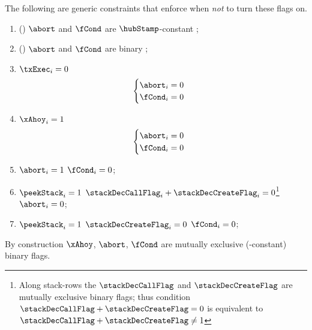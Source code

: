 The following are generic constraints that enforce when \emph{not} to turn these flags on.
\begin{enumerate}
	\item (\trash) $\abort$ and $\fCond$ are $\hubStamp$-constant ;
	\item (\trash) $\abort$ and $\fCond$ are binary ;
	\item \If $\txExec_{i} = 0$ \Then
		\[
			\begin{cases}
				\abort_{i} = 0 \\
				\fCond_{i} = 0 \\
			\end{cases}
		\]
	\item \If $\xAhoy_{i} = 1$ \Then
		\[
			\begin{cases}
				\abort_{i} = 0 \\
				\fCond_{i} = 0 \\
			\end{cases}
		\]
	\item \If $\abort_{i} = 1$ \Then $\fCond_{i} = 0$;
	\item \If $\peekStack_{i} = 1$ \et $\stackDecCallFlag_{i} + \stackDecCreateFlag_{i} = 0$\footnote{Along stack-rows the $\stackDecCallFlag$ and $\stackDecCreateFlag$ are mutually exclusive binary flags; thus condition $\stackDecCallFlag + \stackDecCreateFlag = 0$ is equivalent to $\stackDecCallFlag + \stackDecCreateFlag \neq 1$} \Then $\abort_{i} = 0$;
	\item \If $\peekStack_{i} = 1$ \et $\stackDecCreateFlag_{i} = 0$ \Then $\fCond_{i} = 0$;
\end{enumerate}

\saNote{} \label{note: xahoy + abort + fcond are mutually exclusive binary flags} By construction $\xAhoy$, $\abort$, $\fCond$ are mutually exclusive (\hubStamp{}-constant) binary flags.


